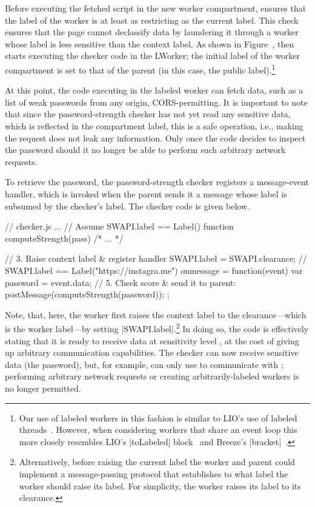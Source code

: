 Before executing the fetched script in the new worker compartment, \sys{}
ensures that the label of the worker is at least as restricting as the
current label.
%
This check ensures that the page cannot declassify data by laundering
it through a worker whose label is less sensitive than the context
label.
%
\iffigures
\ifcompletefigures
As shown in Figure~, 
\fi
\fi
\sys{} then starts
executing the checker code in the LWorker; the initial label of the
worker compartment is set to that of the parent (in this case, the
public label).\footnote{
%
Our use of labeled workers in this fashion is similar to LIO's
use of labeled threads~\cite{stefan:addressing-covert}.
%
However, when considering workers that share an event loop this more
closely resembles LIO's \js|toLabeled|
block~\cite{stefan:2011:flexible} and Breeze's
\js|bracket|~\cite{Breeze13}.
}
 
At this point, the code executing in the labeled worker can fetch
data, such as a list of weak passwords from any origin,
CORS-permitting.
%
It is important to note that since the password-strength checker has
not yet read any sensitive data, which is reflected in the compartment
label, this is a safe operation, i.e., making the request does not
leak any information.
%
Only once the code decides to inspect the password should it no
longer be able to perform such arbitrary network requests.

To retrieve the password, the password-strength checker registers a
message-event handler, which is invoked when the parent sends it a
message whose label is subsumed by the checker's label.
%
The checker code is given below.
\begin{jscode}
// checker.js ...
// Assume SWAPI.label == Label()
function computeStrength(pass) { /* ... */ }

// 3. Raise context label & register handler
SWAPI.label = SWAPI.clearance;
// SWAPI.label == Label("https://instagra.me")
onmessage = function(event) {
  var password = event.data;
  // 5. Check score & send it to parent:
  postMessage(computeStrength(password));
};
\end{jscode}
%
Note, that, here, the worker first raises the context label to the
clearance---which is the worker label---by setting
\js|SWAPI.label|.\footnote{
  Alternatively, before raising the current label the worker and
  parent could implement a message-passing protocol that establishes
  to what label the worker should raise its label. For simplicity, the
  worker raises its label to its clearance.
}
%
In doing so, the code is effectively stating that it is ready to
receive data at sensitivity level , at the cost of
giving up arbitrary communication capabilities.
%
The checker can now receive sensitive data (the password), but, for
example, can only use \xhr{} to communicate with ;
%
performing arbitrary network requests or creating arbitrarily-labeled
workers is no longer permitted.

